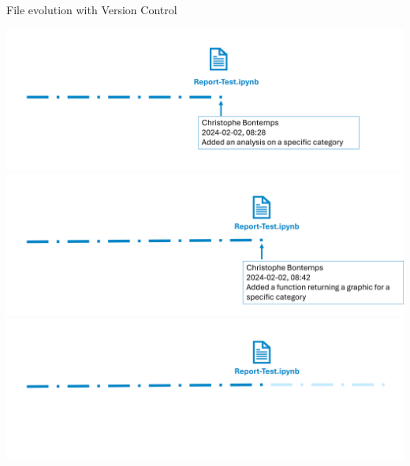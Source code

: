 \documentclass[xcolor=x11names,compress]{beamer}
\renewcommand{\(}{\begin{columns}}
\renewcommand{\)}{\end{columns}}
\newcommand{\<}[1]{\begin{column}{#1}}
\renewcommand{\>}{\end{column}}
\begin{document}
\begin{frame}{File evolution  \textcolor{brique}{with Version Control}  }
\begin{center}
\begin{itemize}
    {\includegraphics[width = 1.0\textwidth]{FileLife5.png} \\ }
    {\includegraphics[width = 1.0\textwidth]{FileLife6.png} \\ }
    {\includegraphics[width = 1.0\textwidth]{FileLife7.png} \\ }
\end{itemize}
\end{center}
\end{frame}
\end{document}

